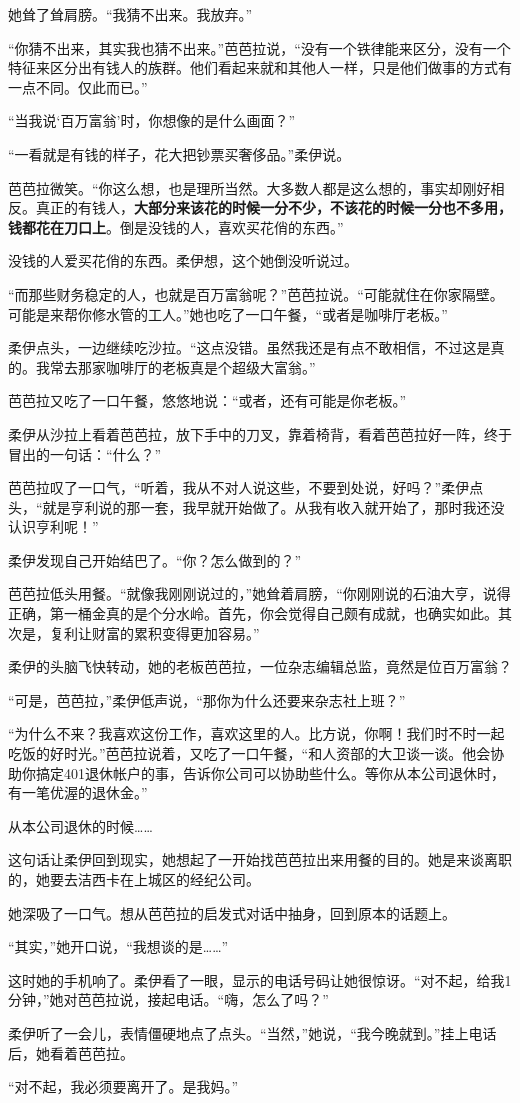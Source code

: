 她耸了耸肩膀。“我猜不出来。我放弃。”

“你猜不出来，其实我也猜不出来。”芭芭拉说，“没有一个铁律能来区分，没有一个特征来区分出有钱人的族群。他们看起来就和其他人一样，只是他们做事的方式有一点不同。仅此而已。”

“当我说‘百万富翁’时，你想像的是什么画面？”

“一看就是有钱的样子，花大把钞票买奢侈品。”柔伊说。

芭芭拉微笑。“你这么想，也是理所当然。大多数人都是这么想的，事实却刚好相反。真正的有钱人，\textbf{大部分来该花的时候一分不少，不该花的时候一分也不多用，钱都花在刀口上}。倒是没钱的人，喜欢买花俏的东西。”

没钱的人爱买花俏的东西。柔伊想，这个她倒没听说过。

“而那些财务稳定的人，也就是百万富翁呢？”芭芭拉说。“可能就住在你家隔壁。可能是来帮你修水管的工人。”她也吃了一口午餐，“或者是咖啡厅老板。”

柔伊点头，一边继续吃沙拉。“这点没错。虽然我还是有点不敢相信，不过这是真的。我常去那家咖啡厅的老板真是个超级大富翁。”

芭芭拉又吃了一口午餐，悠悠地说：“或者，还有可能是你老板。”

柔伊从沙拉上看着芭芭拉，放下手中的刀叉，靠着椅背，看着芭芭拉好一阵，终于冒出的一句话：“什么？”

芭芭拉叹了一口气，“听着，我从不对人说这些，不要到处说，好吗？”柔伊点头，“就是亨利说的那一套，我早就开始做了。从我有收入就开始了，那时我还没认识亨利呢！”

柔伊发现自己开始结巴了。“你？怎么做到的？”

芭芭拉低头用餐。“就像我刚刚说过的，”她耸着肩膀，“你刚刚说的石油大亨，说得正确，第一桶金真的是个分水岭。首先，你会觉得自己颇有成就，也确实如此。其次是，复利让财富的累积变得更加容易。”

柔伊的头脑飞快转动，她的老板芭芭拉，一位杂志编辑总监，竟然是位百万富翁？

“可是，芭芭拉，”柔伊低声说，“那你为什么还要来杂志社上班？”

“为什么不来？我喜欢这份工作，喜欢这里的人。比方说，你啊！我们时不时一起吃饭的好时光。”芭芭拉说着，又吃了一口午餐，“和人资部的大卫谈一谈。他会协助你搞定401退休帐户的事，告诉你公司可以协助些什么。等你从本公司退休时，有一笔优渥的退休金。”

从本公司退休的时候……

这句话让柔伊回到现实，她想起了一开始找芭芭拉出来用餐的目的。她是来谈离职的，她要去洁西卡在上城区的经纪公司。

她深吸了一口气。想从芭芭拉的启发式对话中抽身，回到原本的话题上。

“其实，”她开口说，“我想谈的是……”

这时她的手机响了。柔伊看了一眼，显示的电话号码让她很惊讶。“对不起，给我1分钟，”她对芭芭拉说，接起电话。“嗨，怎么了吗？”

柔伊听了一会儿，表情僵硬地点了点头。“当然，”她说，“我今晚就到。”挂上电话后，她看着芭芭拉。

“对不起，我必须要离开了。是我妈。”
